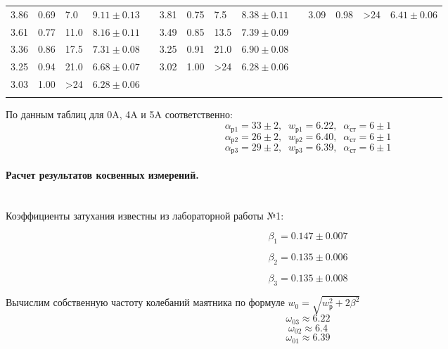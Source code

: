 \documentclass[a4paper]{article}
\begin{document}
\begin{table}[h!]
\begin{tabular}{| m{1.5em} | m{2em} | m{1.5em} |  m{3em} | m{1.5em} | m{1.5em} | m{2em} | m{1.5em} | m{3em}| m{1.5em} | m{1.5em} | m{2em} | m{1.5em}| m{3em} |}
				3.86 &	0.69 &	7.0 &	$9.11 \pm 0.13$ & &	3.81 &	0.75 &	7.5 &	$8.38 \pm 0.11$ & &	3.09 &	0.98 &	>24 &	$6.41 \pm 0.06$
				\\
				\hhline{----~----~----}
				
				3.61 &	0.77 &	11.0 &	$8.16 \pm 0.11$ & &	3.49 &	0.85 &	13.5 &	$7.39 \pm 0.09 $
				\\
				\hhline{----~----~~~~~~}
				
				3.36 &	0.86 &	17.5 &	$7.31 \pm 0.08$ & &	3.25 &	0.91 &	21.0 &	$6.90 \pm 0.08$
				\\
				
				\hhline{----~----~~~~~~}
				
				3.25 &	0.94 &	21.0 &	$6.68 \pm 0.07$ & &	3.02 &	1.00 &	>24 &	$6.28 \pm 0.06$ 
				\\
				
				\hhline{----~----~~~~~~}
				
				3.03 &	1.00 &	>24 &	$6.28 \pm 0.06$
				\\
				
				\hhline{----~~~~~~~~~~~}
				
				
			\end{tabular}

		\end{table}
		
		
		
		По данным таблиц для 0A, 4A и 5A соответственно:
		$$
		\alpha_\text{р1} = 33 \pm 2, \;\; w_\text{р1} = 6.22, \;\; \alpha_\text{ст} = 6 \pm 1
		$$
		$$
		\alpha_\text{р2} = 26 \pm 2, \;\; w_\text{р2} = 6.40, \;\; \alpha_\text{ст} = 6 \pm 1
		$$
		$$
		\alpha_\text{р3} = 29 \pm 2, \;\; w_\text{р3} = 6.39, \; \;
		\alpha_\text{ст} = 6 \pm 1
		$$
		
		\paragraph{Расчет результатов косвенных измерений.}$ $\\
		
		Коэффициенты затухания известны из лабораторной работы №1:
		
		$$
		\beta_1 = 0.147 \pm 0.007
		$$
		
		$$
		\beta_2 = 0.135 \pm 0.006
		$$
		
		$$
		\beta_3 = 0.135 \pm 0.008
		$$
		
		Вычислим собственную частоту колебаний маятника по формуле $w_0 = \sqrt{w_\text{р}^2 + 2\beta^2}$
		$$
		\omega_\text{03} \approx 6.22
		$$
		$$
		\omega_\text{02} \approx 6.4
		$$
		$$
		\omega_\text{01} \approx 6.39
		$$
		
\end{document}
